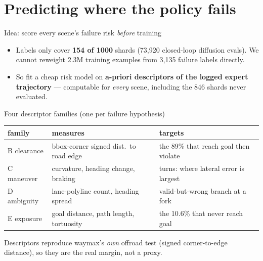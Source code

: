 
\section{Predicting where the policy fails}

\begin{frame}{Idea: score every scene's failure risk \emph{before} training}
  \small
  \begin{itemize}
    \item Labels only cover \textbf{154 of 1000} shards (73{,}920 closed-loop
          diffusion evals). We cannot reweight 2.3M training examples from
          3{,}135 failure labels directly.
    \item So fit a cheap risk model on \textbf{a-priori descriptors of the
          logged expert trajectory} --- computable for \emph{every} scene,
          including the 846 shards never evaluated.
  \end{itemize}
  \begin{block}{Four descriptor families (one per failure hypothesis)}
    \begin{tabular}{@{}lll@{}}
      \toprule
      family & measures & targets \\
      \midrule
      B clearance & bbox-corner signed dist.\ to road edge & the 89\% that reach goal then violate \\
      C maneuver  & curvature, heading change, braking     & turns: where lateral error is largest \\
      D ambiguity & lane-polyline count, heading spread    & valid-but-wrong branch at a fork \\
      E exposure  & goal distance, path length, tortuosity & the 10.6\% that never reach goal \\
      \bottomrule
    \end{tabular}
  \end{block}
  Descriptors reproduce waymax's \emph{own} offroad test (signed corner-to-edge
  distance), so they are the real margin, not a proxy.
\end{frame}


